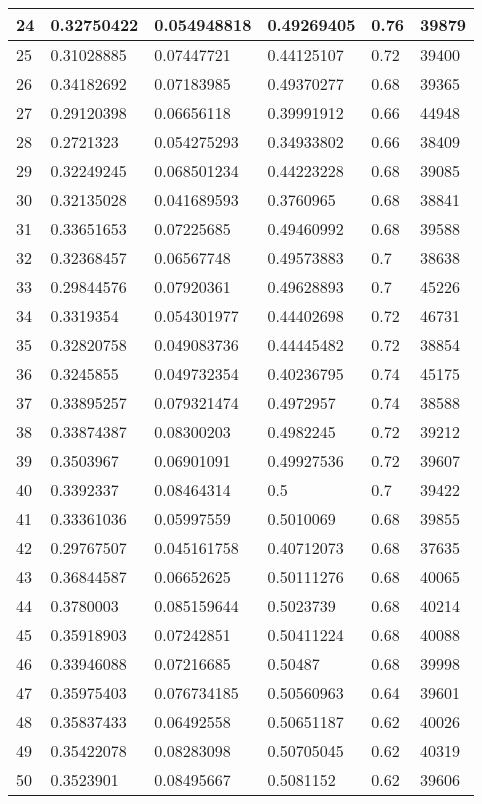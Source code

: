 \begin{longtable}{|l|l|l|l|l|l|}
24 & 0.32750422 & 0.054948818 & 0.49269405 & 0.76 & 39879 \\ \hline 
25 & 0.31028885 & 0.07447721 & 0.44125107 & 0.72 & 39400 \\ \hline 
26 & 0.34182692 & 0.07183985 & 0.49370277 & 0.68 & 39365 \\ \hline 
27 & 0.29120398 & 0.06656118 & 0.39991912 & 0.66 & 44948 \\ \hline 
28 & 0.2721323 & 0.054275293 & 0.34933802 & 0.66 & 38409 \\ \hline 
29 & 0.32249245 & 0.068501234 & 0.44223228 & 0.68 & 39085 \\ \hline 
30 & 0.32135028 & 0.041689593 & 0.3760965 & 0.68 & 38841 \\ \hline 
31 & 0.33651653 & 0.07225685 & 0.49460992 & 0.68 & 39588 \\ \hline 
32 & 0.32368457 & 0.06567748 & 0.49573883 & 0.7 & 38638 \\ \hline 
33 & 0.29844576 & 0.07920361 & 0.49628893 & 0.7 & 45226 \\ \hline 
34 & 0.3319354 & 0.054301977 & 0.44402698 & 0.72 & 46731 \\ \hline 
35 & 0.32820758 & 0.049083736 & 0.44445482 & 0.72 & 38854 \\ \hline 
36 & 0.3245855 & 0.049732354 & 0.40236795 & 0.74 & 45175 \\ \hline 
37 & 0.33895257 & 0.079321474 & 0.4972957 & 0.74 & 38588 \\ \hline 
38 & 0.33874387 & 0.08300203 & 0.4982245 & 0.72 & 39212 \\ \hline 
39 & 0.3503967 & 0.06901091 & 0.49927536 & 0.72 & 39607 \\ \hline 
40 & 0.3392337 & 0.08464314 & 0.5 & 0.7 & 39422 \\ \hline 
41 & 0.33361036 & 0.05997559 & 0.5010069 & 0.68 & 39855 \\ \hline 
42 & 0.29767507 & 0.045161758 & 0.40712073 & 0.68 & 37635 \\ \hline 
43 & 0.36844587 & 0.06652625 & 0.50111276 & 0.68 & 40065 \\ \hline 
44 & 0.3780003 & 0.085159644 & 0.5023739 & 0.68 & 40214 \\ \hline 
45 & 0.35918903 & 0.07242851 & 0.50411224 & 0.68 & 40088 \\ \hline 
46 & 0.33946088 & 0.07216685 & 0.50487 & 0.68 & 39998 \\ \hline 
47 & 0.35975403 & 0.076734185 & 0.50560963 & 0.64 & 39601 \\ \hline 
48 & 0.35837433 & 0.06492558 & 0.50651187 & 0.62 & 40026 \\ \hline 
49 & 0.35422078 & 0.08283098 & 0.50705045 & 0.62 & 40319 \\ \hline 
50 & 0.3523901 & 0.08495667 & 0.5081152 & 0.62 & 39606 \\ \hline 
\end{longtable}